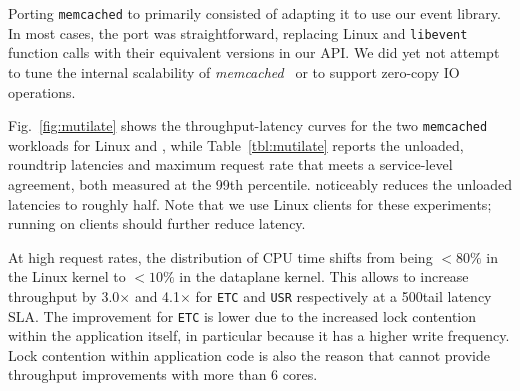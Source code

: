 

Porting \texttt{memcached} to \ix primarily consisted of adapting it
to use our event library. In most cases, the port was straightforward,
replacing Linux and \texttt{libevent} function calls with their
equivalent versions in our API. We did yet not attempt to tune the
internal scalability of {\it memcached}~\cite{DBLP:conf/nsdi/FanAK13}
or to support zero-copy IO operations.


Fig.~\ref{fig:mutilate} shows the throughput-latency curves for the
two \texttt{memcached} workloads for Linux and \ix, while
Table~\ref{tbl:mutilate} reports the unloaded, roundtrip latencies and
maximum request rate that meets a service-level agreement, both
measured at the 99th percentile.  \ix noticeably reduces the unloaded
latencies to roughly half.  Note that we use Linux clients for these
experiments; running \ix on clients should further reduce latency.

At high request rates, the distribution of CPU time shifts from being
$<80\%$ in the Linux kernel to $<10\%$ in the \ix dataplane kernel.
This allows \ix
to increase throughput by 3.0$\times$ and 4.1$\times$ for
\texttt{ETC} and \texttt{USR} respectively at a 500\microsecond tail
latency SLA.  The improvement for \texttt{ETC} is lower due to the
increased lock contention within the application itself, in particular
because it has a higher write frequency.  Lock contention
within application code is also the reason that \ix cannot provide
throughput improvements with more than 6 cores.


%


